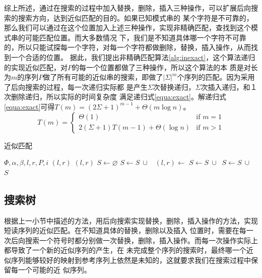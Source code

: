 \documentclass[UTF8,adobefonts]{ctexart}
\begin{document}
综上所述，通过在搜索的过程中加入替换，删除，插入三种操作，可以扩展后向搜索的搜索方向，达到近似匹配的目的。如果已知模式串的
某个字符是不可靠的，那么我们可以通过在这个位置加入上述三种操作，实现非精确匹配，查找到这个模式串的可能匹配位置。而大多数情况
下，我们是不知道具体哪一个字符不可靠的，所以只能试探每一个字符，对每一个字符都做删除，替换，插入操作，从而找到一个合适的位置。
据此，我们提出非精确匹配算法\ref{alg:inexact}，这个算法递归的实现近似匹配，对$P$的每一个位置都做了三种操作，所以这个算法的本
质是对长为$m$的序列$P$做了所有可能的近似串的搜索，即做了$|\Sigma|^m$个序列的匹配。因为采用了后向搜索的过程，每一次递归实际都
是产生$\Sigma$次替换递归，$\Sigma$次插入递归，和１次删除递归，所以实际的时间复杂度
满足递归式\ref{equa:exact}。解递归式\ref{equa:exact}可得$T(m)=(2\Sigma+1)^{m-1}+\Theta(m\log n)$。
\begin{equation}\label{equa:exact}
    T(m)=\begin{cases}\Theta(1) & \mbox{if } m=1 \\
    2(\Sigma+1)T(m-1)+\Theta(\log n) & \mbox{if } m>1\end{cases}
\end{equation}

\begin{algorithm}
    \caption{近似匹配}
    \label{alg:inexact}
    \begin{algorithmic}[1]
    \Require $\Phi,\alpha,\beta,l,r,P,i$
    \Ensure $(l,r)$
    \State \Return $(l,r)$
    \EndIf
    \State $S \gets \varnothing$
    \State $S \gets S\ \cup$\  
    \State $(l,r)\gets$ 
        \State $S \gets S\ \cup\ $  
        \State $S \gets S\ \cup\ $  
        \EndIf
    \EndFor
    \State \Return $S$
    \EndFunction
\end{algorithmic}
\end{algorithm}

\subsection{搜索树}

根据上一小节中描述的方法，用后向搜索实现替换，删除，插入操作的方法，实现短读序列的近似匹配。在不知道具体的替换，删除以及插入
位置时，需要在每一次后向搜索一个符号时都分别做一次替换，删除，插入操作。而每一次操作实际上都导致了一个新的近似序列的产生，在
未完成整个序列的搜索时，最终哪一个近似序列能够较好的映射到参考序列上依然是未知的，这就要求我们在搜索过程中保留每一个可能的近
似序列。
\end{document}
